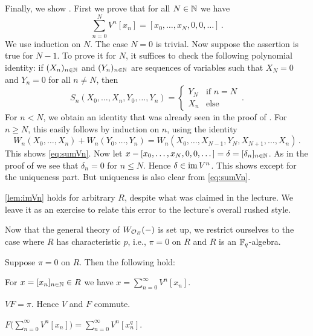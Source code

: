 \documentclass[a4paper, 10pt, oneside, DIV=9, chapterprefix=true, numbers=enddot,bibliography=totoc]{scrbook}
\begin{document}
\begin{proof*}
	Finally, we show . First we prove that for all $N\in \mathbb{N}$ we have
	\begin{equation}\label{eq:sumVn}
		\sum_{n=0}^NV^n[x_n]=[x_0,\dotsc,x_N,0,0,\dotsc]\,.
	\end{equation}
	We use induction on $N$. The case $N=0$ is trivial. Now suppose the assertion is true for $N-1$. To prove it for $N$, it suffices to check the following polynomial identity: if $(X_n)_{n\in\mathbb{N}}$ and $(Y_n)_{n\in\mathbb{N}}$ are sequences of variables such that $X_N=0$ and $Y_n=0$ for all $n\neq N$, then
	\begin{equation*}
		S_n(X_0,\dotsc,X_n,Y_0,\dotsc,Y_n)=\begin{cases}
		Y_N&\text{if }n= N\\
		X_n&\text{else}
		\end{cases}\,.
	\end{equation*}
	For $n<N$, we obtain an identity that was already seen in the proof of . For $n\geq N$, this easily follows by induction on $n$, using the identity
	\begin{equation*}
		W_n(X_0,\dotsc,X_n)+W_n(Y_0,\dotsc,Y_n)=W_n(X_0,\dotsc,X_{N-1},Y_N,X_{N+1},\dotsc,X_n)\,.
	\end{equation*}
	This shows \cref{eq:sumVn}. Now let $x-[x_0,\dotsc,x_N,0,0,\dotsc]=\delta=[\delta_n]_{n\in\mathbb{N}}$. As in the proof of  we see that $\delta_n=0$ for $n\leq N$. Hence $\delta\in\operatorname{im} V^n$. This shows  except for the uniqueness part. But uniqueness is also clear from \cref{eq:sumVn}.
\end{proof*}
\begin{urem*}
	\cref{lem:imVn} holds for arbitrary $R$, despite what was claimed in the lecture. We leave it as an exercise to relate this error to the lecture's overall rushed style.
\end{urem*}
Now that the general theory of $W_{\mathcal{O}_E}(-)$ is set up, we restrict ourselves to the case where $R$ has characteristic $p$, i.e., $\pi=0$ on $R$ and $R$ is an $\mathbb{F}_q$-algebra.
\begin{lem}\label{lem:Vincharp}
	Suppose $\pi=0$ on $R$. Then the following hold:
	\begin{numerate}
		\item For $x=[x_n]_{n\in\mathbb{N}}\in R$ we have $x=\sum_{n=0}^\infty V^n[x_n]$.
		\item $VF=\pi$. Hence $V$ and $F$ commute.
		\item $F\big(\sum_{n=0}^\infty V^n[x_n]\big)=\sum_{n=0}^\infty V^n[x_n^q]$.
	\end{numerate}
\end{lem}
\end{document}
